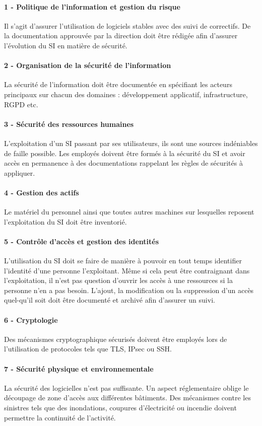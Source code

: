 \documentclass[12pt]{article}
\begin{document}
\paragraph{1 - Politique de l'information et gestion du risque} 
Il s'agit d'assurer l'utilisation de logiciels stables avec des suivi de correctifs. 
De la documentation approuvée par la direction doit être rédigée afin d'assurer l'évolution du SI en matière de sécurité.
\paragraph{2 - Organisation  de la sécurité de l'information} 
La sécurité de l'information doit être documentée en spécifiant les acteurs principaux sur chacun des domaines : développement applicatif, infrastructure, RGPD etc.
\paragraph{3 - Sécurité des ressources humaines} 
L'exploitation d'un SI passant par ses utilisateurs, ils sont une sources indéniables de faille possible. 
Les employés doivent être formés à la sécurité du SI et avoir accès en permanence à des documentations rappelant les règles de sécurités à appliquer. 
\paragraph{4 - Gestion des actifs}
Le matériel du personnel ainsi que toutes autres machines sur lesquelles reposent l'exploitation du SI doit être inventorié.
\paragraph{5 - Contrôle d'accès et gestion des identités} 
L'utilisation du SI doit se faire de manière à pouvoir en tout temps identifier l'identité d'une personne l'exploitant. 
Même si cela peut être contraignant dans l'exploitation, il n'est pas question d'ouvrir les accès à une ressources si la personne n'en a pas besoin. 
L'ajout, la modification ou la suppression d'un accès quel-qu'il soit doit être documenté et archivé afin d'assurer un suivi.
\paragraph{6 - Cryptologie} 
Des mécanismes cryptographique sécurisés doivent être employés lors de l'utilisation de protocoles tels que TLS, IPsec ou SSH.
\paragraph{7 - Sécurité physique et environnementale} 
La sécurité des logicielles n'est pas suffisante. 
Un aspect réglementaire oblige le découpage de zone d'accès aux différentes bâtiments. 
Des mécanismes contre les sinistres tels que des inondations, coupures d'électricité ou incendie doivent permettre la continuité de l'activité. 
\end{document}
